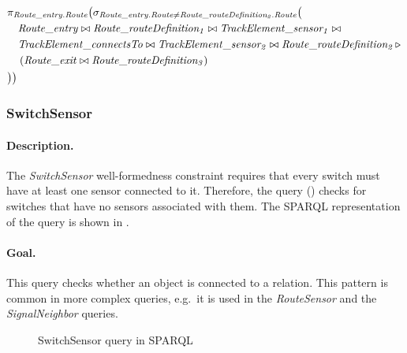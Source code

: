 \begin{align*}
& \pi_{\mathit{Route\_entry.Route}} \big( \sigma_{\mathit{Route\_entry.Route} \neq \mathit{Route\_routeDefinition_2.Route}} \big( \\
& \quad \mathit{Route\_entry} \bowtie \mathit{Route\_routeDefinition_1} \bowtie \mathit{TrackElement\_sensor_1} \bowtie \\
& \quad \mathit{TrackElement\_connectsTo} \bowtie \mathit{TrackElement\_sensor_2} \bowtie \mathit{Route\_routeDefinition_2} \, \triangleright \, \\
& \quad \left( \mathit{Route\_exit} \bowtie \mathit{Route\_routeDefinition_3} \right) \\
& \big) \big)
\end{align*}

\subsubsection{SwitchSensor}

\paragraph{Description.} The \textit{SwitchSensor} well-formedness constraint requires that every switch must have at least one sensor connected to it. Therefore, the query () checks for switches that have no sensors associated with them. The SPARQL representation of the query is shown in .

\paragraph{Goal.} This query checks whether an object is connected to a relation. This pattern is common in more complex queries, e.g.\ it is used in the \textit{RouteSensor} and the \textit{SignalNeighbor} queries.

\begin{figure}[Htb]
\centering
\begin{minipage}{0.5\textwidth}
  { \alignListing
    }
  \caption{SwitchSensor query in SPARQL}
  \label{lst:switchsensor-sparql}
\end{minipage}
\end{figure}

% 
% 


